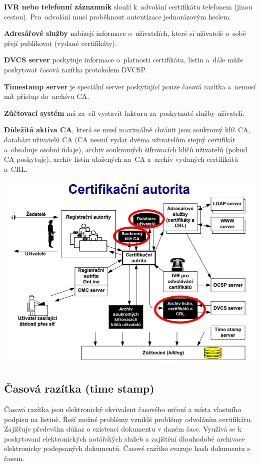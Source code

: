 \textbf{IVR nebo telefonní záznamník} slouží k~odvolání certifikátu telefonem (jinou cestou). Pro~odvolání musí proběhnout autentizace jednorázovým heslem.

\textbf{Adresářové služby} nabízejí informace o~uživatelích, které si uživatelé o~sobě přejí publikovat (vydané certifikáty).

\textbf{DVCS server} poskytuje informace o~platnosti certifikátu, listin a~dále může poskytovat časová razítka protokolem DVCSP.

\textbf{Timestamp server} je speciální server poskytující pouze časová razítka a~nemusí mít přístup do~archívu CA.

\textbf{Zúčtovací systém} má za~cíl vystavit fakturu za~poskytnuté služby uživateli.

\textbf{Důležitá aktiva CA}, která se musí maximálně chránit jsou soukromý klíč CA, databázi uživatelů CA (CA nesmí vydat dvěma uživatelům stejný certifikát a~obsahuje osobní údaje), archiv soukromých šifrovacích klíčů uživatelů (pokud CA poskytuje), archiv listin uložených na~CA a~archiv vydaných certifikátů a~CRL.
\begin{center}
\includegraphics[scale=0.5]{images/CA.jpg}
\end{center}

\subsection{Časová razítka (time stamp)}

Časová razítka jsou elektronický ekvivalent časového určení a místa vlastního podpisu na listině. Řeší možné problémy vzniklé problémy odvoláním certifikátu. Zajišťuje především důkaz o existenci dokumentu v daném čase. Využívá se k poskytovaní elektronických notářských služeb a zajištění dlouhodobé archivace elektronicky podepsaných dokumentů. Časové razítko svazuje hash dokumentu s časem.


